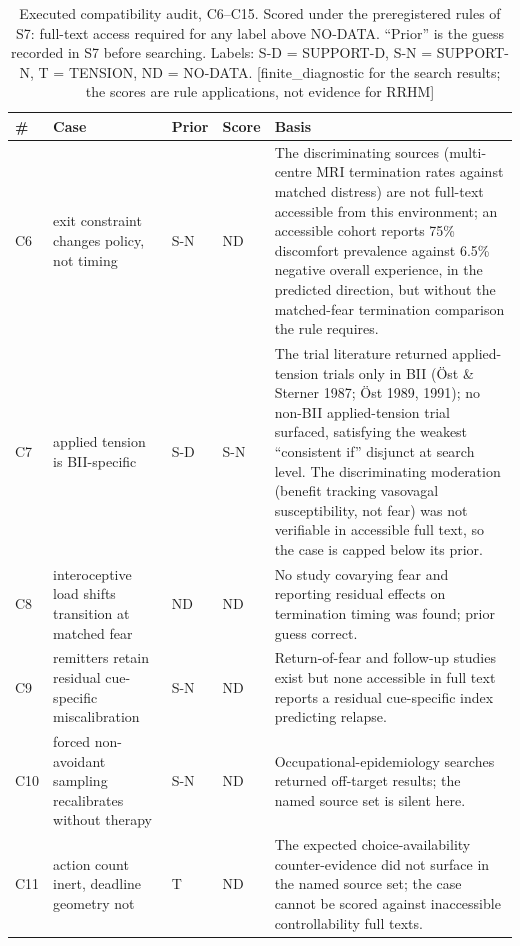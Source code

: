 \documentclass[9pt,twocolumn]{article}
\newcommand{\tier}[1]{{\sffamily\scriptsize\color{RRHMSlate}[#1]}}
\begin{document}
\begin{table}[!t]
\centering
\caption{Executed compatibility audit, C6--C15. Scored under the preregistered rules of S7: full-text access required for any label above NO-DATA. ``Prior'' is the guess recorded in S7 before searching. Labels: S-D = SUPPORT-D, S-N = SUPPORT-N, T = TENSION, ND = NO-DATA. \tier{finite\_diagnostic for the search results; the scores are rule applications, not evidence for RRHM}}
\label{tab:audit}
\small
\begin{tabularx}{\textwidth}{p{}p{}p{}p{}X}
\toprule
\textbf{\#} & \textbf{Case} & \textbf{Prior} & \textbf{Score} & \textbf{Basis} \\
\midrule
C6 & exit constraint changes policy, not timing & S-N & ND & The discriminating sources (multi-centre MRI termination rates against matched distress) are not full-text accessible from this environment; an accessible cohort reports 75\% discomfort prevalence against 6.5\% negative overall experience, in the predicted direction, but without the matched-fear termination comparison the rule requires. \\
C7 & applied tension is BII-specific & S-D & S-N & The trial literature returned applied-tension trials only in BII (\"Ost \& Sterner 1987; \"Ost 1989, 1991); no non-BII applied-tension trial surfaced, satisfying the weakest ``consistent if'' disjunct at search level. The discriminating moderation (benefit tracking vasovagal susceptibility, not fear) was not verifiable in accessible full text, so the case is capped below its prior. \\
C8 & interoceptive load shifts transition at matched fear & ND & ND & No study covarying fear and reporting residual effects on termination timing was found; prior guess correct. \\
C9 & remitters retain residual cue-specific miscalibration & S-N & ND & Return-of-fear and follow-up studies exist but none accessible in full text reports a residual cue-specific index predicting relapse. \\
C10 & forced non-avoidant sampling recalibrates without therapy & S-N & ND & Occupational-epidemiology searches returned off-target results; the named source set is silent here. \\
C11 & action count inert, deadline geometry not & T & ND & The expected choice-availability counter-evidence did not surface in the named source set; the case cannot be scored against inaccessible controllability full texts. \\

\end{tabularx}
\end{table}
\end{document}
